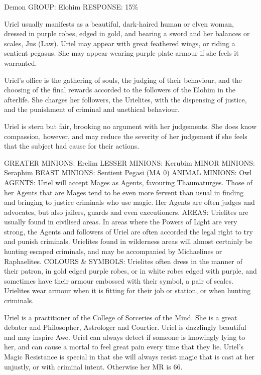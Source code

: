 \begin{Description}

\item[Type] Demon
GROUP: Elohim
RESPONSE: 15\%

\item[Description] Uriel usually manifests as a beautiful, dark-haired
  human or elven woman, dressed in purple robes, edged in gold, and
  bearing a sword and her balances or scales, Jus (Law). Uriel may
  appear with great feathered wings, or riding a sentient pegasus. She
  may appear wearing purple plate armour if she feels it warranted.
  
\item[Sphere] Uriel's office is the gathering of souls, the judging of
  their behaviour, and the choosing of the final rewards accorded to
  the followers of the Elohim in the afterlife. She charges her
  followers, the Urielites, with the dispensing of justice, and the
  punishment of criminal and unethical behaviour.

\item[Personality] Uriel is stern but fair, brooking no argument with her judgements. She does know compassion, however, and may reduce the severity of her judgement if she feels that the subject had cause for their actions.

GREATER MINIONS: Erelim 
LESSER MINIONS: Kerubim 
MINOR MINIONS: Seraphim 
BEAST MINIONS: Sentient Pegasi (MA 0)
ANIMAL MINIONS: Owl
AGENTS: Uriel will accept Mages as Agents, favouring Thaumaturges. Those of her Agents that are Mages tend to be even more fervent than usual in finding and bringing to justice criminals who use magic. Her Agents are often judges and advocates, but also jailers, guards and even executioners.
AREAS: Urielites are usually found in civilised areas. In areas where the Powers of Light are very strong, the Agents and followers of Uriel are often accorded the legal right to try and punish criminals. Urielites found in wilderness areas will almost certainly be hunting escaped criminals, and may be accompanied by Michaelines or Raphaelites.
COLOURS \& SYMBOLS: Urielites often dress in the manner of their patron, in gold edged purple robes, or in white robes edged with purple, and sometimes have their armour embossed with their symbol, a pair of scales.  Urielites wear armour when it is fitting for their job or station, or when hunting criminals.

\item[Avatar abilities] Uriel is a practitioner of the College of
  Sorceries of the Mind. She is a great debater and Philosopher,
  Astrologer and Courtier. Uriel is dazzlingly beautiful and may
  inspire Awe. Uriel can always detect if someone is knowingly lying
  to her, and can cause a mortal to feel great pain every time that
  they lie. Uriel's Magic Resistance is special in that she will
  always resist magic that is cast at her unjustly, or with criminal
  intent. Otherwise her MR is 66.


\end{Description}
